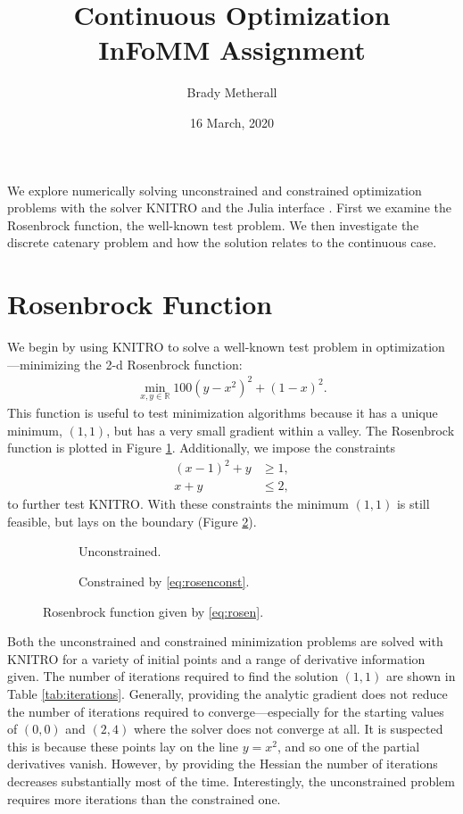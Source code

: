 \documentclass[11pt,a4paper]{article}
\title{Continuous Optimization \\ InFoMM Assignment}
\author{Brady Metherall}
\date{16 March, 2020}
\begin{document}
\maketitle

We explore numerically solving unconstrained and constrained optimization problems with the solver KNITRO \cite{knitro} and the Julia interface \cite{juliadoc, juliaopt}. First we examine the Rosenbrock function, the well-known test problem. We then investigate the discrete catenary problem and how the solution relates to the continuous case.

\section{Rosenbrock Function}
We begin by using KNITRO to solve a well-known test problem in optimization---minimizing the 2-d Rosenbrock function:
\begin{align}
	\min_{x, y \in \mathbb{R}} 100(y - x^2)^2 + (1 - x)^2.
	\label{eq:rosen}
\end{align}
This function is useful to test minimization algorithms because it has a unique minimum, $(1,1)$, but has a very small gradient within a valley. The Rosenbrock function is plotted in Figure \ref{fig:rosenunconst}. Additionally, we impose the constraints 
\begin{equation}
	\begin{aligned}
		(x - 1)^2 + y &\geq 1, \\
		x + y &\leq 2,
	\end{aligned}
	\label{eq:rosenconst}
\end{equation}
to further test KNITRO. With these constraints the minimum $(1,1)$ is still feasible, but lays on the boundary (Figure \ref{fig:rosenconst}).

\begin{figure}[tbp]
	\centering
	\begin{subfigure}{0.48\textwidth}
		\centering
		
		\caption{Unconstrained.}
		\label{fig:rosenunconst}
	\end{subfigure} %
	\begin{subfigure}{0.48\textwidth}
		\centering
		
		\caption{Constrained by \eqref{eq:rosenconst}.}
		\label{fig:rosenconst}
	\end{subfigure}
	\caption{Rosenbrock function given by \eqref{eq:rosen}.}
	\label{fig:rosen}
\end{figure}

Both the unconstrained and constrained minimization problems are solved with KNITRO for a variety of initial points and a range of derivative information given. The number of iterations required to find the solution $(1,1)$ are shown in Table \ref{tab:iterations}. Generally, providing the analytic gradient does not reduce the number of iterations required to converge---especially for the starting values of $(0,0)$ and $(2,4)$ where the solver does not converge at all. It is suspected this is because these points lay on the line $y = x^2$, and so one of the partial derivatives vanish. However, by providing the Hessian the number of iterations decreases substantially most of the time. Interestingly, the unconstrained problem requires more iterations than the constrained one.
\end{document}
